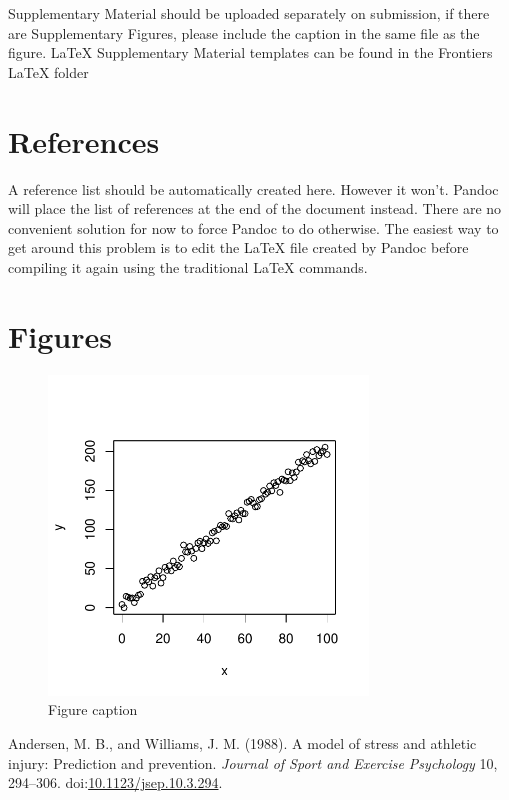 \documentclass[utf8]{frontiersHLTH}
\begin{document}
Supplementary Material should be uploaded separately on submission, if
there are Supplementary Figures, please include the caption in the same
file as the figure. LaTeX Supplementary Material templates can be found
in the Frontiers LaTeX folder

\hypertarget{references}{%
\section{References}\label{references}}

A reference list should be automatically created here. However it won't.
Pandoc will place the list of references at the end of the document
instead. There are no convenient solution for now to force Pandoc to do
otherwise. The easiest way to get around this problem is to edit the
LaTeX file created by Pandoc before compiling it again using the
traditional LaTeX commands.

\hypertarget{figures}{%
\section*{Figures}\label{figures}}

\begin{figure}

{\centering \includegraphics[width=85mm,height=85mm]{full_paper_v2_files/figure-latex/Figure-1-1} 

}

\caption{Figure caption}\label{fig:Figure-1}
\end{figure}

\hypertarget{refs}{}
\leavevmode\hypertarget{ref-Andersen1988}{}%
Andersen, M. B., and Williams, J. M. (1988). A model of stress and
athletic injury: Prediction and prevention. \emph{Journal of Sport and
Exercise Psychology} 10, 294--306.
doi:\href{https://doi.org/10.1123/jsep.10.3.294}{10.1123/jsep.10.3.294}.
\end{document}
